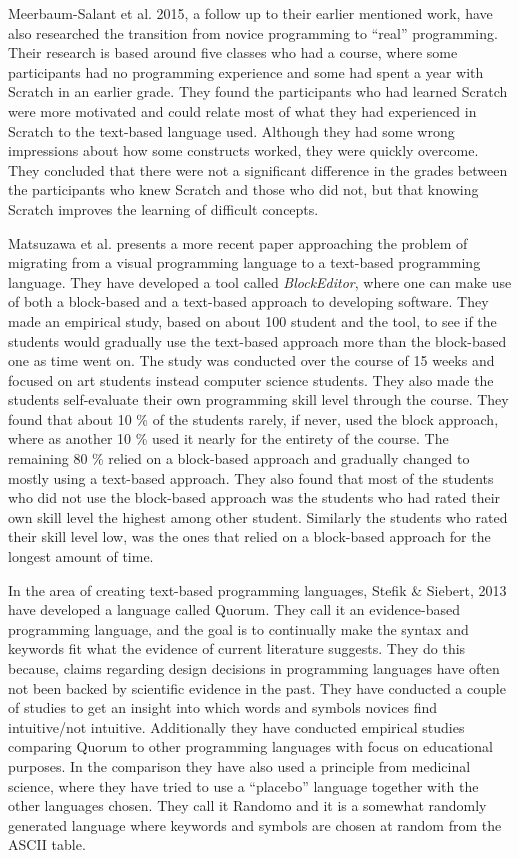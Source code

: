Meerbaum-Salant et al. 2015\cite{from_scratch_to_real}, a follow up to their earlier mentioned work, have also researched the transition from novice programming to ``real'' programming. Their research is based around five classes who had a course, where some participants had no programming experience and some had spent a year with Scratch in an earlier grade. They found the participants who had learned Scratch were more motivated and could relate most of what they had experienced in Scratch to the text-based language used. Although they had some wrong impressions about how some constructs worked, they were quickly overcome. They concluded that there were not a significant difference in the grades between the participants who knew Scratch and those who did not, but that knowing Scratch improves the learning of difficult concepts.

Matsuzawa et al. \cite{block_editor} presents a more recent paper approaching the problem of migrating from a visual programming language to a text-based programming language. They have developed a tool called \emph{BlockEditor}, where one can make use of both a block-based and a text-based approach to developing software. They made an empirical study, based on about 100 student and the tool, to see if the students would gradually use the text-based approach more than the block-based one as time went on. The study was conducted over the course of 15 weeks and focused on art students instead computer science students. They also made the students self-evaluate their own programming skill level through the course. They found that about 10 \% of the students rarely, if never, used the block approach, where as another 10 \% used it nearly for the entirety of the course. The remaining 80 \% relied on a block-based approach and gradually changed to mostly using a text-based approach. They also found that most of the students who did not use the block-based approach was the students who had rated their own skill level the highest among other student. Similarly the students who rated their skill level low, was the ones that relied on a block-based approach for the longest amount of time.

In the area of creating text-based programming languages, Stefik \& Siebert, 2013\cite{stefik_all_studies} have developed a language called Quorum. They call it an evidence-based programming language, and the goal is to continually make the syntax and keywords fit what the evidence of current literature suggests. They do this because, claims regarding design decisions in programming languages have often not been backed by scientific evidence in the past\cite{ShaneMarkstrum10}. They have conducted a couple of studies to get an insight into which words and symbols novices find intuitive/not intuitive. Additionally they have conducted empirical studies comparing Quorum to other programming languages with focus on educational purposes. In the comparison they have also used a principle from medicinal science, where they have tried to use a ``placebo'' language together with the other languages chosen. They call it Randomo and it is a somewhat randomly generated language where keywords and symbols are chosen at random from the ASCII table.

